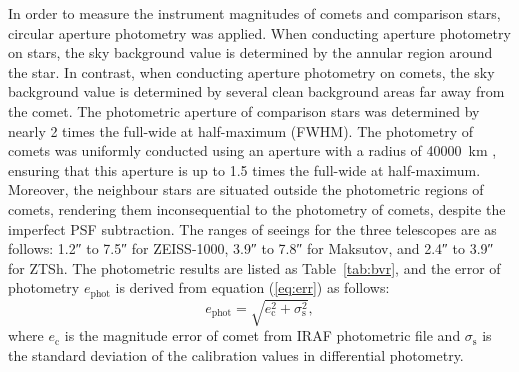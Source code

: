 In order to measure the instrument magnitudes of comets and comparison stars, circular aperture photometry was applied. When conducting aperture photometry on stars, the sky background value is determined by the annular region around the star. In contrast, when conducting aperture photometry on comets, the sky background value is determined by several clean background areas far away from the comet. The photometric aperture of comparison stars was determined by nearly \num{2} times the full-wide at half-maximum (FWHM). The photometry of comets was uniformly conducted using an aperture with a radius of {\qty{40000}{\km}} , ensuring that this aperture is up to \num{1.5} times the full-wide at half-maximum. Moreover, the neighbour stars are situated outside the photometric regions of comets, rendering them inconsequential to the photometry of comets, despite the imperfect PSF subtraction. 
The ranges of seeings for the three telescopes are as follows: \ang{;;1.2} to \ang{;;7.5} for ZEISS-1000, \ang{;;3.9} to \ang{;;7.8} for Maksutov, and \ang{;;2.4} to \ang{;;3.9} for ZTSh. The photometric results are listed as Table~\ref{tab:bvr}, and the error of photometry $e_{\mathrm{phot}}$ is derived from equation (\ref{eq:err}) as follows: 
\begin{equation}
    e_{\mathrm{phot}} = \sqrt{e_{\mathrm{c}}^{2} + \sigma_\mathrm{s}^2}, 
    \label{eq:err}
\end{equation}
where $e_\mathrm{c}$ is the magnitude error of comet from IRAF photometric file and $\sigma_\mathrm{s}$ is the standard deviation of the calibration values in differential photometry. 






